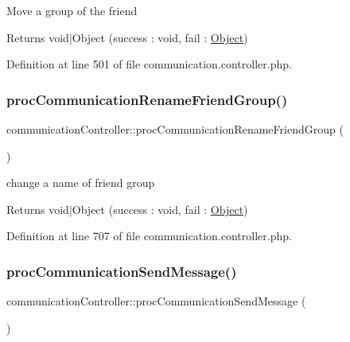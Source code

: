 Move a group of the friend \begin{DoxyReturn}{Returns}
void$\vert$\+Object (success \+: void, fail \+: \hyperlink{classObject}{Object}) 
\end{DoxyReturn}


Definition at line 501 of file communication.\+controller.\+php.

\mbox{\label{classcommunicationController_acdfb1b461be46bd6fa56be917fe04d37}} 
\subsubsection{\texorpdfstring{proc\+Communication\+Rename\+Friend\+Group()}{procCommunicationRenameFriendGroup()}}
{\footnotesize\ttfamily communication\+Controller\+::proc\+Communication\+Rename\+Friend\+Group (\begin{DoxyParamCaption}{ }\end{DoxyParamCaption})}

change a name of friend group \begin{DoxyReturn}{Returns}
void$\vert$\+Object (success \+: void, fail \+: \hyperlink{classObject}{Object}) 
\end{DoxyReturn}


Definition at line 707 of file communication.\+controller.\+php.

\mbox{\label{classcommunicationController_a0461424490faa37eb0ee59f3493bc5c5}} 
\subsubsection{\texorpdfstring{proc\+Communication\+Send\+Message()}{procCommunicationSendMessage()}}
{\footnotesize\ttfamily communication\+Controller\+::proc\+Communication\+Send\+Message (\begin{DoxyParamCaption}{ }\end{DoxyParamCaption})}

